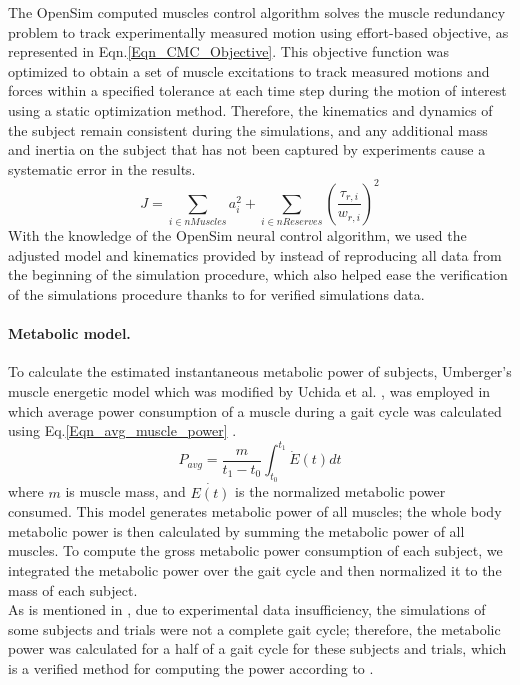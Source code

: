 \documentclass[10pt,letterpaper]{article}
\begin{document}
The OpenSim computed muscles control algorithm solves the muscle redundancy problem to track experimentally measured motion using effort-based objective, as represented in Eqn.\eqref{Eqn_CMC_Objective}. This objective function was optimized to obtain a set of muscle excitations to track measured motions and forces within a specified tolerance at each time step during the motion of interest using a static optimization method\cite{92}. Therefore, the kinematics and dynamics of the subject remain consistent during the simulations, and any additional mass and inertia on the subject that has not been captured by experiments cause a systematic error in the results.\\
\begin{equation}\label{Eqn_CMC_Objective}
J = \sum_{i\in nMuscles} a_{i}^{2} + \sum_{i \in nReserves} (\frac{\tau_{r,i}}{w_{r,i}})^2
\end{equation}
With the knowledge of the OpenSim neural control algorithm, we used the adjusted model and kinematics provided by \cite{93} instead of reproducing all data from the beginning of the simulation procedure, which also helped ease the verification of the simulations procedure thanks to \cite{93} for verified simulations data.\\
\paragraph*{Metabolic model.} To calculate the estimated instantaneous metabolic power of subjects, Umberger's muscle energetic model \cite{105} which was modified by Uchida et al. \cite{106}, was employed in which average power consumption of a muscle during a gait cycle was calculated using Eq.\eqref{Eqn_avg_muscle_power} \cite{106}.\\
\begin{equation}\label{Eqn_avg_muscle_power}
	P_{avg} = \frac{m}{t_1 - t_0}\int_{t_0}^{t_1} \dot{E}(t) dt
\end{equation}
where $m$ is muscle mass, and $\dot{E(t)}$ is the normalized metabolic power consumed. This model generates metabolic power of all muscles; the whole body metabolic power is then calculated by summing the metabolic power of all muscles\cite{106}. To compute the gross metabolic power consumption of each subject, we integrated the metabolic power over the gait cycle and then normalized it to the mass of each subject.\\
As is mentioned in \cite{93}, due to experimental data insufficiency, the simulations of some subjects and trials were not a complete gait cycle; therefore, the metabolic power was calculated for a half of a gait cycle for these subjects and trials, which is a verified method for computing the power according to \cite{93}. \\
\end{document}
